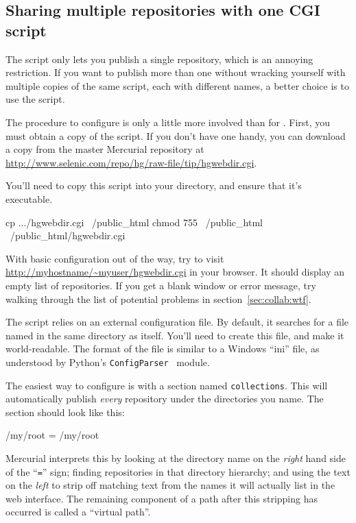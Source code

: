 \subsection{Sharing multiple repositories with one CGI script}

The  script only lets you publish a single
repository, which is an annoying restriction.  If you want to publish
more than one without wracking yourself with multiple copies of the
same script, each with different names, a better choice is to use the
 script.

The procedure to configure  is only a little
more involved than for .  First, you must obtain
a copy of the script.  If you don't have one handy, you can download a
copy from the master Mercurial repository at
\url{http://www.selenic.com/repo/hg/raw-file/tip/hgwebdir.cgi}.

You'll need to copy this script into your 
directory, and ensure that it's executable.
\begin{codesample2}
  cp .../hgwebdir.cgi ~/public_html
  chmod 755 ~/public_html ~/public_html/hgwebdir.cgi
\end{codesample2}
With basic configuration out of the way, try to visit
\url{http://myhostname/~myuser/hgwebdir.cgi} in your browser.  It
should display an empty list of repositories.  If you get a blank
window or error message, try walking through the list of potential
problems in section~\ref{sec:collab:wtf}.

The  script relies on an external
configuration file.  By default, it searches for a file named
 in the same directory as itself.  You'll need
to create this file, and make it world-readable.  The format of the
file is similar to a Windows ``ini'' file, as understood by Python's
\texttt{ConfigParser}~\cite{web:configparser} module.

The easiest way to configure  is with a
section named \texttt{collections}.  This will automatically publish
\emph{every} repository under the directories you name.  The section
should look like this:
\begin{codesample2}
  [collections]
  /my/root = /my/root
\end{codesample2}
Mercurial interprets this by looking at the directory name on the
\emph{right} hand side of the ``\texttt{=}'' sign; finding
repositories in that directory hierarchy; and using the text on the
\emph{left} to strip off matching text from the names it will actually
list in the web interface.  The remaining component of a path after
this stripping has occurred is called a ``virtual path''.

